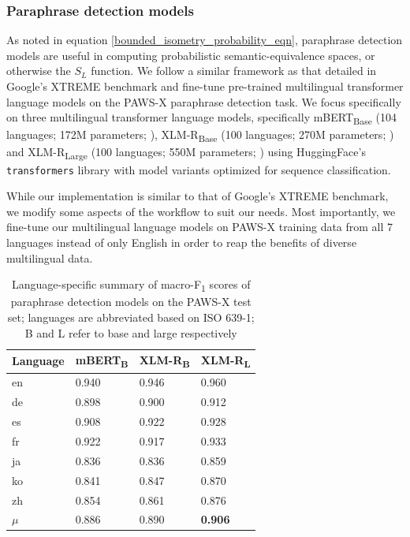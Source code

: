 \documentclass[11pt,a4paper]{article}
\begin{document}
\subsubsection{Paraphrase detection models}

As noted in equation \ref{bounded_isometry_probability_eqn}, paraphrase detection models are useful in computing probabilistic semantic-equivalence spaces, or otherwise the $S_L$ function. We follow a similar framework as that detailed in Google's XTREME benchmark \cite{hu2020xtreme} and fine-tune pre-trained multilingual transformer language models on the PAWS-X paraphrase detection task. We focus specifically on three multilingual transformer language models, specifically mBERT\textsubscript{Base} (104 languages; 172M parameters; \citealt{devlin-etal-2019-bert}), XLM-R\textsubscript{Base} (100 languages; 270M parameters; \citealt{conneau2019unsupervised}) and XLM-R\textsubscript{Large} (100 languages; 550M parameters; \citealt{conneau2019unsupervised}) using HuggingFace's \texttt{transformers} library \cite{Wolf2019HuggingFacesTS} with model variants optimized for sequence classification.

While our implementation is similar to that of Google's XTREME benchmark, we modify some aspects of the workflow to suit our needs. Most importantly, we fine-tune our multilingual language models on PAWS-X training data from all 7 languages instead of only English in order to reap the benefits of diverse multilingual data.

\begin{table}
  \centering
  \begin{tabular}{llll}
    \hline
    \textbf{Language} & \textbf{mBERT\textsubscript{B}} & \textbf{XLM-R\textsubscript{B}} & \textbf{XLM-R\textsubscript{L}} \\
    \hline
    en & 0.940 & 0.946 & 0.960 \\
    de & 0.898 & 0.900 & 0.912 \\
    es & 0.908 & 0.922 & 0.928 \\
    fr & 0.922 & 0.917 & 0.933 \\
    ja & 0.836 & 0.836 & 0.859 \\
    ko & 0.841 & 0.847 & 0.870 \\
    zh & 0.854 & 0.861 & 0.876 \\
    \hline \hline
    $\mu$ & 0.886 & 0.890 & \textbf{0.906} \\
    \hline
  \end{tabular} 
  \caption{Language-specific summary of macro-F\textsubscript{1} scores of paraphrase detection models on the PAWS-X test set; languages are abbreviated based on ISO 639-1; B and L refer to base and large respectively}
  \label{pawsx_score_breakdown}
\end{table}
\end{document}
